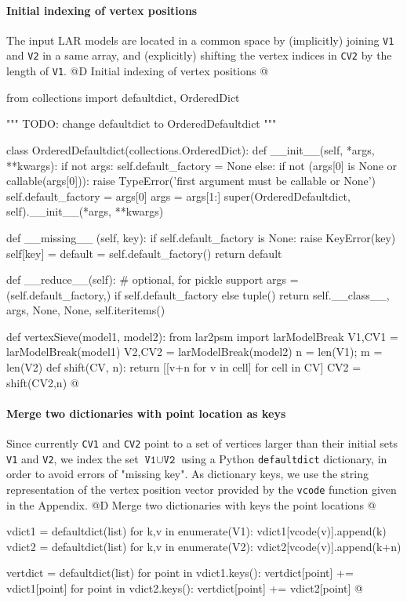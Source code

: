 \documentclass[11pt,oneside]{article}	%
\begin{document}
\paragraph{Initial indexing of vertex positions}
The input LAR models are located in a common space by (implicitly) joining \texttt{V1} and \texttt{V2} in a same array, and (explicitly) shifting the vertex indices in \texttt{CV2} by the length of \texttt{V1}.
@D Initial indexing of vertex positions
@{from collections import defaultdict, OrderedDict

""" TODO: change defaultdict to OrderedDefaultdict """

class OrderedDefaultdict(collections.OrderedDict):
    def __init__(self, *args, **kwargs):
        if not args:
            self.default_factory = None
        else:
            if not (args[0] is None or callable(args[0])):
                raise TypeError('first argument must be callable or None')
            self.default_factory = args[0]
            args = args[1:]
        super(OrderedDefaultdict, self).__init__(*args, **kwargs)

    def __missing__ (self, key):
        if self.default_factory is None:
            raise KeyError(key)
        self[key] = default = self.default_factory()
        return default

    def __reduce__(self):  # optional, for pickle support
        args = (self.default_factory,) if self.default_factory else tuple()
        return self.__class__, args, None, None, self.iteritems()


def vertexSieve(model1, model2):
	from lar2psm import larModelBreak
	V1,CV1 = larModelBreak(model1) 
	V2,CV2 = larModelBreak(model2)
	n = len(V1); m = len(V2)
	def shift(CV, n): 
		return [[v+n for v in cell] for cell in CV]
	CV2 = shift(CV2,n)
@}

\paragraph{Merge two dictionaries with point location as keys}
Since currently \texttt{CV1} and \texttt{CV2} point to a set of vertices larger than their initial sets 
\texttt{V1} and \texttt{V2}, we index the set $\texttt{V1} \cup \texttt{V2}$ using a Python \texttt{defaultdict} dictionary, in order to avoid errors of "missing key". As dictionary keys, we use the string representation of the vertex position vector provided by the \texttt{vcode} function given in the Appendix.
@D Merge two dictionaries with keys the point locations
@{	
	vdict1 = defaultdict(list)
	for k,v in enumerate(V1): vdict1[vcode(v)].append(k) 
	vdict2 = defaultdict(list)
	for k,v in enumerate(V2): vdict2[vcode(v)].append(k+n) 
	
	vertdict = defaultdict(list)
	for point in vdict1.keys(): vertdict[point] += vdict1[point]
	for point in vdict2.keys(): vertdict[point] += vdict2[point]
@}
\end{document}
